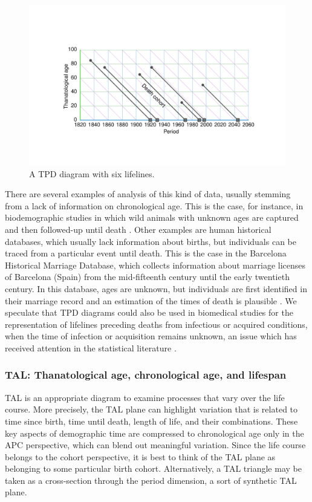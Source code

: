 \documentclass[12pt,oneside,a4paper]{article} %
\theoremstyle{definition}
\begin{document}
\begin{figure}[h!] 
\caption{A TPD diagram with six lifelines.}
\label{fig:TPD}
\centering
\includegraphics[scale=0.8]{Figures/TPDrt.pdf}
\end{figure} 
There are several examples of analysis of this kind of data, usually stemming
from a lack of information on chronological age. This is the case, for instance,
in biodemographic studies in which wild animals with unknown ages are captured
and then followed-up until death \citep{muller2004demographic,
muller2007survival}. Other examples are human historical databases, which
usually lack information about births, but individuals can be traced from a
particular event until death. This is the case in the Barcelona Historical
Marriage Database, which collects information about marriage licenses of
Barcelona (Spain) from the mid-fifteenth century until the early twentieth
century. In this database, ages are unknown, but individuals are first
identified in their marriage record and an estimation of the times of death is
plausible \citep{villavicencio2015reconstructing}. We speculate that TPD
diagrams could also be used in biomedical studies for the representation of
lifelines preceding deaths from infectious or acquired conditions, when the time
of infection or acquisition remains unknown, an issue which has received
attention in the statistical literature \citep[see e.g.][]{chan2010backward}.

\FloatBarrier
\subsubsection{TAL: Thanatological age, chronological age, and
lifespan}
\label{sec:tal}
\FloatBarrier  
TAL is an appropriate diagram to examine processes that vary over the
life course.
More precisely, the TAL plane can highlight variation that is related to time
since birth, time until death, length of life, and their combinations. These
key aspects of demographic time are compressed to chronological age only in the
APC perspective, which can blend out meaningful variation. Since the life course
belongs to the cohort perspective, it is best to think of the TAL plane as belonging to some particular birth cohort. Alternatively, a TAL triangle may be taken as a cross-section through the period dimension, a sort of synthetic TAL plane.
\end{document}

